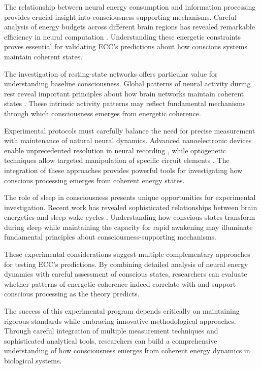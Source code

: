 \begin{refsection}
The relationship between neural energy consumption and information processing provides crucial insight into consciousness-supporting mechanisms. Careful analysis of energy budgets across different brain regions has revealed remarkable efficiency in neural computation \cite{Howarth2012}. Understanding these energetic constraints proves essential for validating ECC's predictions about how conscious systems maintain coherent states.

The investigation of resting-state networks offers particular value for understanding baseline consciousness. Global patterns of neural activity during rest reveal important principles about how brain networks maintain coherent states \cite{Scholvinck2013}. These intrinsic activity patterns may reflect fundamental mechanisms through which consciousness emerges from energetic coherence.

Experimental protocols must carefully balance the need for precise measurement with maintenance of natural neural dynamics. Advanced nanoelectronic devices enable unprecedented resolution in neural recording \cite{Kuzum2014}, while optogenetic techniques allow targeted manipulation of specific circuit elements \cite{Yizhar2011}. The integration of these approaches provides powerful tools for investigating how conscious processing emerges from coherent energy states.

The role of sleep in consciousness presents unique opportunities for experimental investigation. Recent work has revealed sophisticated relationships between brain energetics and sleep-wake cycles \cite{DiNuzzo2017}. Understanding how conscious states transform during sleep while maintaining the capacity for rapid awakening may illuminate fundamental principles about consciousness-supporting mechanisms.

These experimental considerations suggest multiple complementary approaches for testing ECC's predictions. By combining detailed analysis of neural energy dynamics with careful assessment of conscious states, researchers can evaluate whether patterns of energetic coherence indeed correlate with and support conscious processing as the theory predicts.

The success of this experimental program depends critically on maintaining rigorous standards while embracing innovative methodological approaches. Through careful integration of multiple measurement techniques and sophisticated analytical tools, researchers can build a comprehensive understanding of how consciousness emerges from coherent energy dynamics in biological systems.


\end{refsection}
